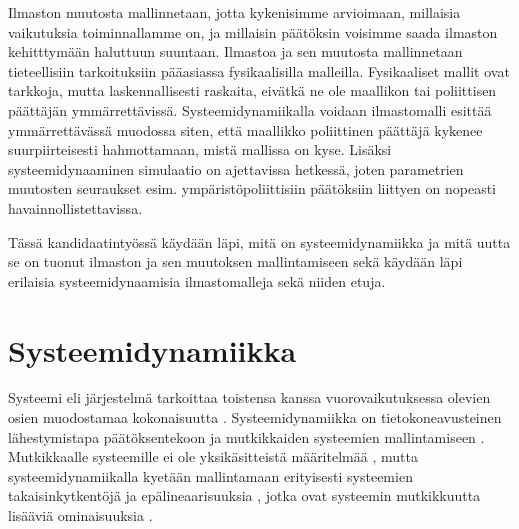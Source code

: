 \documentclass[finnish,12pt,a4paper,pdftex]{article}
\begin{document}
\begin{onehalfspacing}
Ilmaston muutosta mallinnetaan, jotta kykenisimme arvioimaan, millaisia vaikutuksia toiminnallamme on, ja millaisin päätöksin voisimme saada ilmaston kehitttymään haluttuun suuntaan. Ilmastoa ja sen muutosta mallinnetaan tieteellisiin tarkoituksiin pääasiassa fysikaalisilla malleilla. Fysikaaliset mallit ovat tarkkoja, mutta laskennallisesti raskaita, eivätkä ne ole maallikon tai poliittisen päättäjän ymmärrettävissä. Systeemidynamiikalla voidaan ilmastomalli esittää ymmärrettävässä muodossa siten, että maallikko poliittinen päättäjä kykenee suurpiirteisesti hahmottamaan, mistä mallissa on kyse. Lisäksi systeemidynaaminen simulaatio on ajettavissa hetkessä, joten parametrien muutosten seuraukset esim. ympäristöpoliittisiin päätöksiin liittyen on nopeasti havainnollistettavissa. 

Tässä kandidaatintyössä käydään läpi, mitä on systeemidynamiikka ja mitä uutta se on tuonut ilmaston ja sen muutoksen mallintamiseen sekä käydään läpi erilaisia systeemidynaamisia ilmastomalleja sekä niiden etuja. 



\clearpage



\section{Systeemidynamiikka \label{sysdyn}}


Systeemi eli järjestelmä tarkoittaa toistensa kanssa vuorovaikutuksessa olevien osien muodostamaa kokonaisuutta \cite{Flood1988}. Systeemidynamiikka on tietokoneavusteinen lähestymistapa päätöksentekoon ja mutkikkaiden systeemien mallintamiseen \cite{WhatIsSystemDynamics}. Mutkikkaalle systeemille ei ole yksikäsitteistä määritelmää \cite{Zadeh1973}, mutta systeemidynamiikalla kyetään mallintamaan erityisesti systeemien takaisinkytkentöjä ja epälineaarisuuksia \cite{WhatIsSystemDynamics}, jotka ovat systeemin mutkikkuutta lisääviä ominaisuuksia \cite{Zadeh1973}. %


\end{onehalfspacing}
\end{document}
